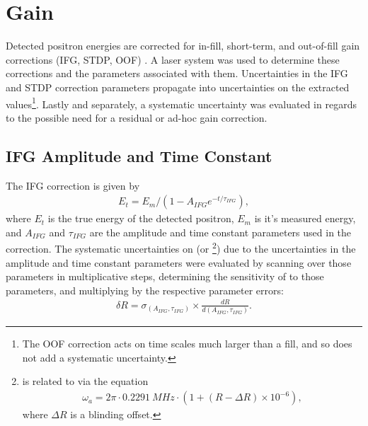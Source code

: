 
\graphicspath{{Body/Figures/Gain/IFG/60h/Amplitude/}{Body/Figures/Gain/IFG/60h/Amplitude-With-AdHoc/}{Body/Figures/Gain/IFG/60h/Lifetime/}{Body/Figures/Gain/IFG/9d/Lifetime/}{Body/Figures/Gain/ResidualGain/EnergyBinKloss/}{Body/Figures/Gain/ResidualGain/Chi2Min/}}

\section{Gain}


Detected positron energies are corrected for in-fill, short-term, and out-of-fill gain corrections (IFG, STDP, OOF) \cite[and references therein]{GainNote}. A laser system was used to determine these corrections and the parameters associated with them. Uncertainties in the IFG and STDP correction parameters propagate into uncertainties on the extracted \wa values\footnote{The OOF correction acts on time scales much larger than a fill, and so does not add a systematic uncertainty.}. Lastly and separately, a systematic uncertainty was evaluated in regards to the possible need for a residual or ad-hoc gain correction.



\subsection{IFG Amplitude and Time Constant}


The IFG correction is given by
\begin{align}
  E_{t} = E_{m}/(1 - A_{IFG} e^{-t/\tau_{IFG}}),
\end{align}
where $E_{t}$ is the true energy of the detected positron, $E_{m}$ is it's measured energy, and $A_{IFG}$ and $\tau_{IFG}$ are the amplitude and time constant parameters used in the correction. The systematic uncertainties on \wa (or \R\footnote{\R is related to \wa via the equation
\begin{align}
  \omega_{a} = 2\pi \cdot \SI{0.2291}{MHz} \cdot (1 + (R - \Delta R) \times 10^{-6}),
\label{eq:wa}
\end{align}
where $\Delta R$ is a blinding offset.}) due to the uncertainties in the amplitude and time constant parameters were evaluated by scanning over those parameters in multiplicative steps, determining the sensitivity of \R to those parameters, and multiplying by the respective parameter errors:
    \begin{align}
        \delta R = \sigma_{(A_{IFG}, \tau_{IFG})} \times \frac{dR}{d(A_{IFG}, \tau_{IFG})}.
    \end{align}



